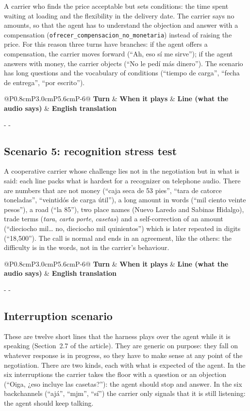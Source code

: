 \documentclass[11pt]{article}
\makeatletter
\newcommand{\need}[1]{\par\penalty-100\begingroup
  \setlength{\dimen@}{#1}%
  \dimen@ii\pagegoal \advance\dimen@ii-\pagetotal
  \ifdim\dimen@>\dimen@ii \ifdim\dimen@ii>\z@\vfil\fi \penalty-\@M \fi
  \endgroup}
\newenvironment{scripttable}[2]{%
\begin{table}[H]
\centering
\caption{#1}
\label{#2}
\footnotesize
\renewcommand{\arraystretch}{1.15}
\setlength{\tabcolsep}{4pt}
\begin{tabular}{@{}P{0.8cm}P{3.0cm}P{5.6cm}P{\dimexpr\linewidth-9.4cm-6\tabcolsep\relax}@{}}
\toprule
\textbf{Turn} & \textbf{When it plays} & \textbf{Line (what the audio says)} & \textbf{English translation}\\
\midrule}{%
\bottomrule
\end{tabular}
\end{table}}
\makeatother
\begin{document}
A carrier who finds the price acceptable but sets conditions: the time spent
waiting at loading and the flexibility in the delivery date. The carrier says no
amounts, so that the agent has to understand the objection and answer with a
compensation (\texttt{ofrecer\_compensacion\_no\_monetaria}) instead of raising the
price. For this reason three turns have branches: if the agent offers a
compensation, the carrier moves forward (``Ah, eso sí me sirve''); if the agent
answers with money, the carrier objects (``No le pedí más dinero''). The scenario
has long questions and the vocabulary of conditions (``tiempo de carga'', ``fecha
de entrega'', ``por escrito'').

\begin{scripttable}{Scenario 4, non-monetary objection: the carrier's lines.}{tab:guion-e4}
\end{scripttable}

\need{11.5cm}
\subsection{Scenario 5: recognition stress test}

A cooperative carrier whose challenge lies not in the negotiation but in what is
said: each line packs what is hardest for a recognizer on telephone audio. There
are numbers that are not money (``caja seca de 53 pies'', ``tara de catorce
toneladas'', ``veintidós de carga útil''), a long amount in words (``mil ciento
veinte pesos''), a road (``la 85''), two place names (Nuevo Laredo and Sabinas
Hidalgo), trade terms (\emph{tara}, \emph{carta porte}, \emph{casetas}) and a
self-correction of an amount (``dieciocho mil\ldots{} no, dieciocho mil
quinientos'') which is later repeated in digits (``18,500''). The call is normal
and ends in an agreement, like the others: the difficulty is in the words, not in
the carrier's behaviour.

\begin{scripttable}{Scenario 5, recognition stress test: the carrier's lines.}{tab:guion-e5}
\end{scripttable}

\need{12.5cm}
\subsection{Interruption scenario}

These are twelve short lines that the harness plays over the agent while it is
speaking (Section~2.7 of the article). They are generic on purpose: they fall on
whatever response is in progress, so they have to make sense at any point of the
negotiation. There are two kinds, each with what is expected of the agent. In the
six interruptions the carrier takes the floor with a question or an objection
(``Oiga, ¿eso incluye las casetas?''): the agent should stop and answer. In the six
backchannels (``ajá'', ``mjm'', ``sí'') the carrier only signals that it is still
listening: the agent should keep talking.
\end{document}
